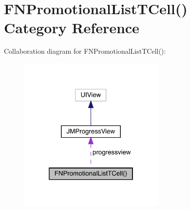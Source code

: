 \hypertarget{category_f_n_promotional_list_t_cell_07_08}{}\section{F\+N\+Promotional\+List\+T\+Cell() Category Reference}
\label{category_f_n_promotional_list_t_cell_07_08}


Collaboration diagram for F\+N\+Promotional\+List\+T\+Cell()\+:\nopagebreak
\begin{figure}[H]
\begin{center}
\leavevmode
\includegraphics[width=208pt]{category_f_n_promotional_list_t_cell_07_08__coll__graph}
\end{center}
\end{figure}
